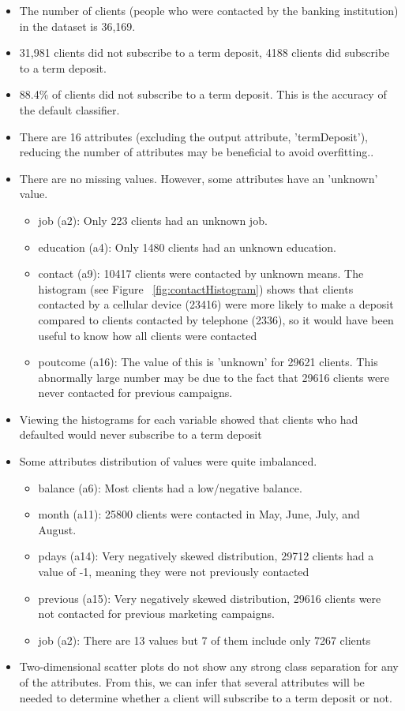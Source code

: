 \documentclass[a4paper,11pt]{article}
\begin{document}
\begin{itemize}
  \item{The number of clients (people who were contacted by the banking institution) in
  the dataset is 36,169.}
  \item{31,981 clients did not subscribe to a term deposit, 4188 clients did subscribe to a term deposit.}
  \item{88.4\% of clients did not subscribe to a term deposit. This is the accuracy of the default classifier.} 
  \item{There are 16 attributes (excluding the output attribute, 'termDeposit'), reducing the number of attributes may be beneficial to avoid overfitting..}
  \item{There are no missing values. However, some attributes have an 'unknown' value.}
  \begin{itemize}
    \item{job (a2): Only 223 clients had an unknown job.}
    \item{education (a4): Only 1480 clients had an unknown education.}
    \item{contact (a9): 10417 clients were contacted by unknown means. The histogram (see Figure ~\ref{fig:contactHistogram}) shows
    that clients contacted by a cellular device (23416) were more likely to make a deposit
    compared to clients contacted by telephone (2336), so it would have been useful to know how
    all clients were contacted}
    \item{poutcome (a16): The value of this is 'unknown' for 29621 clients. This abnormally
    large number may be due to the fact that 29616 clients were never contacted for previous campaigns.}
  \end{itemize}
  \item{Viewing the histograms for each variable showed that clients who had defaulted
  would never subscribe to a term deposit}
  \item{Some attributes distribution of values were quite imbalanced.}
  \begin{itemize}
      \item{balance (a6): Most clients had a low/negative balance.}
      \item{month (a11): 25800 clients were contacted in May, June, July, and August.}
      \item{pdays (a14): Very negatively skewed distribution, 29712 clients had a value of -1,
      meaning they were not previously contacted}
      \item{previous (a15): Very negatively skewed distribution, 29616 clients were not contacted for
      previous marketing campaigns.}
      \item{job (a2): There are 13 values but 7 of them include only 7267 clients}
  \end{itemize}
  \item{Two-dimensional scatter plots do not show any strong class separation for any of the attributes.
  From this, we can infer that several attributes will be needed to determine whether a client will
  subscribe to a term deposit or not.}
\end{itemize}
\end{document}
